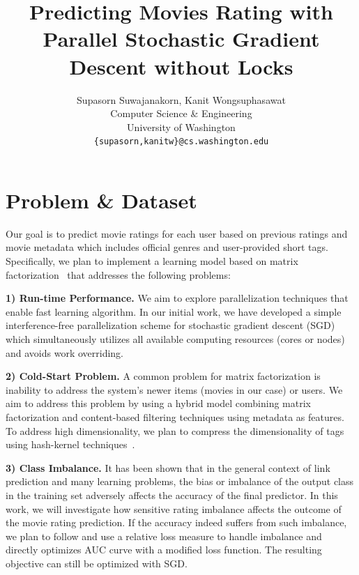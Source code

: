 \documentclass{article} %
\title{Predicting Movies Rating with Parallel Stochastic Gradient Descent without Locks}
\author{
Supasorn Suwajanakorn, Kanit Wongsuphasawat \\
Computer Science \& Engineering\\
University of Washington\\
\texttt{\{supasorn,kanitw\}@cs.washington.edu} \\
}
\begin{document}
\maketitle


\section{Problem \& Dataset}

Our goal is to predict movie ratings for each user based on previous ratings and movie metadata which includes official genres and user-provided short tags.  Specifically, we plan to implement a learning model based on matrix factorization~\cite{koren:matrix} that addresses the following problems:

\textbf{1) Run-time Performance.}  We aim to explore parallelization techniques that enable fast learning algorithm.  In our initial work, we have developed a simple interference-free parallelization scheme for stochastic gradient descent (SGD) which simultaneously utilizes all available computing resources (cores or nodes) and avoids work overriding.


\textbf{2) Cold-Start Problem.}  A common problem for matrix factorization is inability to address the system’s  newer items (movies in our case) or users.  We aim to address this problem by using a hybrid model combining matrix factorization and content-based filtering techniques using metadata as features.  To address high dimensionality, we plan to compress the dimensionality of tags using hash-kernel techniques~\cite{shi:hashkernels}.

\textbf{3) Class Imbalance.}  It has been shown that in the general context of link prediction and many learning problems, the bias or imbalance of the output class in the training set adversely affects the accuracy of the final predictor. In this work, we will investigate how sensitive rating imbalance affects the outcome of the movie rating prediction. If the accuracy indeed suffers from such imbalance, we plan to follow \cite{menon:link-prediction} and use a relative loss measure to handle imbalance and directly optimizes AUC curve with a modified loss function. The resulting objective can still be optimized with SGD.
\end{document}
